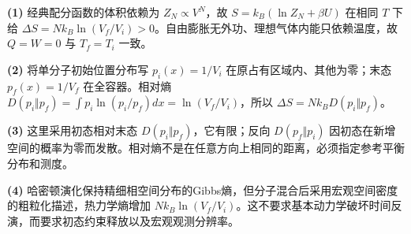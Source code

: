 \par\noindent\textbf{(1)} 经典配分函数的体积依赖为 \(Z_N\propto V^N\)，故 \(S=k_B(\ln Z_N+\beta U)\) 在相同 \(T\) 下给 \(\Delta S=Nk_B\ln(V_f/V_i)>0\)。自由膨胀无外功、理想气体内能只依赖温度，故 \(Q=W=0\) 与 \(T_f=T_i\) 一致。
\par\noindent\textbf{(2)} 将单分子初始位置分布写 \(p_i(x)=1/V_i\) 在原占有区域内、其他为零；末态 \(p_f(x)=1/V_f\) 在全容器。相对熵 \(D(p_i\Vert p_f)=\int p_i\ln(p_i/p_f)dx=\ln(V_f/V_i)\)，所以 \(\Delta S=Nk_B D(p_i\Vert p_f)\)。
\par\noindent\textbf{(3)} 这里采用初态相对末态 \(D(p_i\Vert p_f)\)，它有限；反向 \(D(p_f\Vert p_i)\) 因初态在新增空间的概率为零而发散。相对熵不是在任意方向上相同的距离，必须指定参考平衡分布和测度。
\par\noindent\textbf{(4)} 哈密顿演化保持精细相空间分布的Gibbs熵，但分子混合后采用宏观空间密度的粗粒化描述，热力学熵增加 \(Nk_B\ln(V_f/V_i)\)。这不要求基本动力学破坏时间反演，而要求初态约束释放以及宏观观测分辨率。
